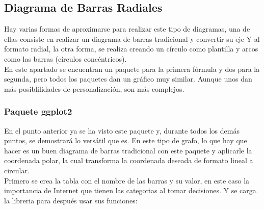 \documentclass{article}\usepackage[]{graphicx}\usepackage[]{color}
\begin{document}
\subsection{Diagrama de Barras Radiales} \label{ssec:barrasRadiales}
Hay varias formas de aproximarse para realizar este tipo de diagramas, una de ellas consiste en realizar un diagrama de barras tradicional y convertir su eje Y al formato radial, la otra forma, se realiza creando un c\'irculo como plantilla y arcos como las barras (c\'irculos conc\'entricos).~\\
En este apartado se encuentran un paquete para la primera f\'ormula y dos para la segunda, pero todos los paquetes dan un gr\'afico muy similar. Aunque unos dan m\'as  posiblilidades de personalizaci\'on, son m\'as complejos.
\subsubsection{Paquete ggplot2}
En el punto anterior ya se ha visto este paquete%
 y, durante todos los dem\'as puntos, se demostrar\'a lo vers\'atil que es. En este tipo de grafo, lo que hay que hacer es un buen diagrama de barras tradicional con este paquete y aplicarle la coordenada polar, la cual transforma la coordenada deseada de formato lineal a circular.~\\
Primero se crea la tabla con el nombre de las barras y su valor, en este caso la importancia de Internet que tienen las categorias al tomar decisiones. Y se carga la libreria para despu\'es usar sus funciones:
\end{document}
